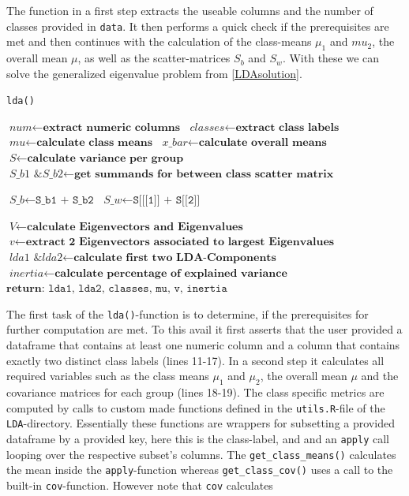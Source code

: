 \documentclass{article}
\begin{document}
The function in a first step extracts the useable columns and the number of classes provided in \texttt{data}. It then performs a quick check if the prerequisites are met and then continues with the calculation of the class-means $\mu_1$ and $mu_2$, the overall mean $\mu$, as well as the scatter-matrices $S_b$ and $S_w$. With these we can solve the generalized eigenvalue problem from \ref{LDAsolution}.

\begin{algorithm}
\caption{\texttt{lda()}} \label{lda-function}
\begin{algorithmic}[1]
\State $\textit{num} \gets \textbf{extract numeric columns}$
\State $\textit{classes} \gets \textbf{extract class labels}$
\State $\textit{mu} \gets \textbf{calculate class means}$
\State $\textit{x\_bar} \gets \textbf{calculate overall means}$
\State $\textit{S} \gets \textbf{calculate variance per group}$
\State $\textit{S\_b1 \& S\_b2} \gets \textbf{get summands for between class scatter matrix}$
\EndProcedure

\State $\textit{S\_b} \gets \texttt{S\_b1 + S\_b2}$
\State $\textit{S\_w} \gets \texttt{S[[[1]] + S[[2]]}$
\EndProcedure

\State $\textit{V} \gets \textbf{calculate Eigenvectors and Eigenvalues}$
\State $\textit{v} \gets \textbf{extract 2 Eigenvectors associated to largest Eigenvalues}$
\State $\textit{lda1 \& lda2} \gets \textbf{calculate first two LDA-Components}$
\State $\textit{inertia} \gets \textbf{calculate percentage of explained variance}$
\State $\textbf{return: } \texttt{lda1, lda2, classes, mu, v, inertia}$
\EndProcedure

\end{algorithmic}
\end{algorithm}

The first task of the \texttt{lda()}-function is to determine, if the prerequisites for further computation are met. To this avail it first asserts that the user provided a dataframe that contains at least one numeric column and a column that contains exactly two distinct class labels (lines 11-17). In a second step it calculates all required variables such as the class means $\mu_1$ and $\mu_2$, the overall mean $\mu$ and the covariance matrices for each group (lines 18-19). The class specific metrics are computed by calls to custom made functions defined in the \texttt{utils.R}-file of the \texttt{LDA}-directory. Essentially these functions are wrappers for subsetting a provided dataframe by a provided key, here this is the class-label, and and an \texttt{apply} call looping over the respective subset's columns. The \texttt{get\_class\_means()} calculates the mean inside the \texttt{apply}-function whereas \texttt{get\_class\_cov()} uses a call to the built-in \texttt{cov}-function. However note that \texttt{cov} calculates 
\end{document}
